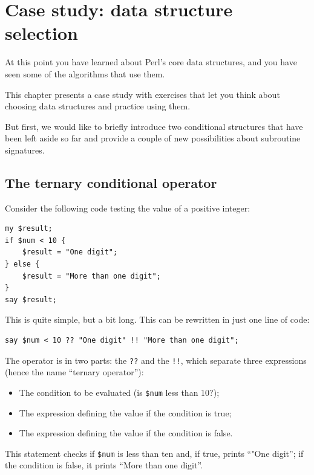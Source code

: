 
\chapter{Case study: data structure selection}
\label{data_struct_sel}

At this point you have learned about Perl's core data structures,
and you have seen some of the algorithms that use them.

This chapter presents a case study with exercises that let
you think about choosing data structures and practice using them.

But first, we would like to briefly introduce two conditional 
structures that have been left aside so far and provide 
a couple of new possibilities about subroutine signatures. 

\section{The ternary conditional operator}
\label{ternary operator}

Consider the following code testing the value of a positive 
integer:

\begin{verbatim}
my $result;
if $num < 10 {
    $result = "One digit";
} else {
    $result = "More than one digit";
}
say $result;
\end{verbatim}

This is quite simple, but a bit long. This can be rewritten 
in just one line of code:

\begin{verbatim}
say $num < 10 ?? "One digit" !! "More than one digit";
\end{verbatim}

The operator is in two parts: the {\tt ??} and the {\tt !!}, which 
separate three expressions (hence the name ``ternary operator''): 
\begin{itemize}
\item The condition to be evaluated (is \verb'$num' less than 10?);
\item The expression defining the value if the condition is true;
\item The expression defining the value if the condition is false.
\end{itemize}

This statement checks if \verb'$num' is less than ten and, if 
true, prints ``"One digit''; if the 
condition is false, it prints ``More than one digit''.

